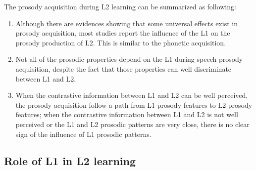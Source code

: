 The prosody acquisition during L2 learning can be summarized as following:
\begin{enumerate}
\item Although there are evidences showing that some universal effects exist in prosody acquisition, most studies report the influence of the L1 on the prosody production of L2. This is similar to the phonetic acquisition.
\item Not all of the prosodic properties depend on the L1 during speech prosody acquisition, despite the fact that those properties can well discriminate between L1 and L2.
\item When the contrastive information between L1 and L2 can be well perceived, the prosody acquisition follow a path from L1 prosody features to L2 prosody features; when the contrastive information between L1 and L2 is not well perceived or the L1 and L2 prosodic patterns are very close, there is no clear sign of the influence of L1 prosodic patterns.
\end{enumerate}


\subsection{Role of L1 in L2 learning}

